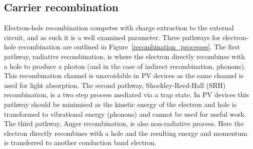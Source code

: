 

\subsection{Carrier recombination} \label{recombination}
Electron-hole recombination competes with charge extraction to the external circuit, and as such it is a well examined parameter. Three pathways for electron-hole recombination are outlined in Figure\ \ref{recombination_processes}. The first pathway, radiative recombination, is where the electron directly recombines with a hole to produce a photon (and in the case of indirect recombination, phonons). This recombination channel is unavoidable in PV devices as the same channel is used for light absorption. The second pathway, Shockley-Reed-Hall (SRH) recombination, is a two step process mediated via a trap state. In PV devices this pathway should be minimised as the kinetic energy of the electron and hole is transformed to vibrational energy (phonons) and cannot be used for useful work. The third pathway, Auger recombination, is also non-radiative process. Here the electron directly recombines with a hole and the resulting energy and momentum is transferred to another conduction band electron.

